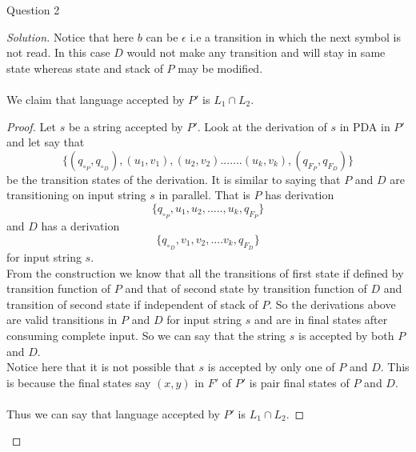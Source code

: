 \begin{solution}{Question 2}
\begin{proof}[Solution]
    Notice that here $b$ can be $\epsilon$ i.e a transition in which the next symbol is not read. In this case $D$ would not make any transition and will stay in same state whereas state and stack of $P$ may be modified.\\
    \\
    We claim that language accepted by $P'$ is $L_1 \cap L_2$. 
    \begin{proof}
    Let $s$ be a string accepted by $P'$. Look at the derivation of $s$ in PDA in $P'$ and let say that 
    \[\{(q_{\circ_P},  q_{\circ_D}), (u_1, v_1), (u_2, v_2).......(u_k, v_k), (q_{F_P}, q_{F_D})\}\] 
    be the transition states of the derivation. It is similar to saying that $P$ and $D$ are transitioning on input string $s$ in parallel. That is $P$ has derivation \[\{q_{\circ_P}, u_1, u_2, ....., u_k, q_{F_P}\}\] 
    and $D$ has a derivation  
    \[\{q_{\circ_D}, v_1, v_2, .... v_k, q_{F_D}\}\] 
    for input string $s$. \\
    From the construction we know that all the transitions of first state if defined by transition function of $P$ and that of second state by transition function of $D$ and transition of second state if independent of stack of $P$. So the derivations above are valid transitions in $P$ and $D$ for input string $s$ and are in final states after consuming complete input. So we can say that the string $s$ is accepted by both $P$ and $D$. \\
    Notice here that it is not possible that $s$ is accepted by only one of $P$ and $D$. This is because the final states say $(x, y)$ in $F'$ of $P'$ is pair final states of $P$ and $D$.\\
    \\
    Thus we can say that language accepted by $P'$ is $L_1 \cap L_2$.
    \end{proof}
    \end{proof}
\end{solution}
